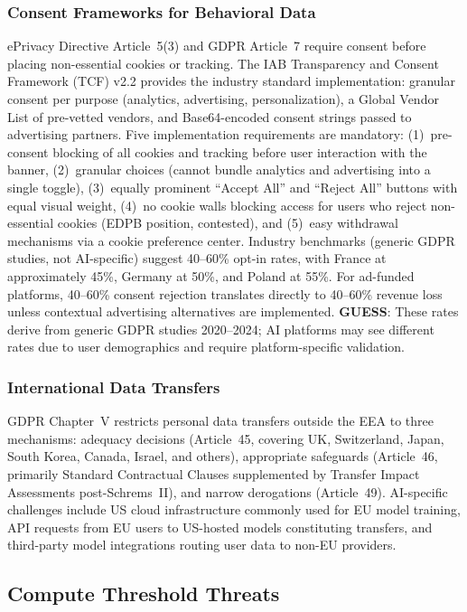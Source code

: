\documentclass[11pt,a4paper]{article}
\begin{document}
\subsubsection{Consent Frameworks for Behavioral Data}

ePrivacy Directive Article~5(3) and GDPR Article~7 require consent before placing non-essential cookies or tracking. The IAB Transparency and Consent Framework (TCF) v2.2 provides the industry standard implementation: granular consent per purpose (analytics, advertising, personalization), a Global Vendor List of pre-vetted vendors, and Base64-encoded consent strings passed to advertising partners. Five implementation requirements are mandatory: (1)~pre-consent blocking of all cookies and tracking before user interaction with the banner, (2)~granular choices (cannot bundle analytics and advertising into a single toggle), (3)~equally prominent ``Accept All'' and ``Reject All'' buttons with equal visual weight, (4)~no cookie walls blocking access for users who reject non-essential cookies (EDPB position, contested), and (5)~easy withdrawal mechanisms via a cookie preference center. Industry benchmarks (generic GDPR studies, not AI-specific) suggest 40--60\% opt-in rates, with France at approximately 45\%, Germany at 50\%, and Poland at 55\%. For ad-funded platforms, 40--60\% consent rejection translates directly to 40--60\% revenue loss unless contextual advertising alternatives are implemented. \textbf{GUESS}: These rates derive from generic GDPR studies 2020--2024; AI platforms may see different rates due to user demographics and require platform-specific validation.

\subsubsection{International Data Transfers}

GDPR Chapter~V restricts personal data transfers outside the EEA to three mechanisms: adequacy decisions (Article~45, covering UK, Switzerland, Japan, South Korea, Canada, Israel, and others), appropriate safeguards (Article~46, primarily Standard Contractual Clauses supplemented by Transfer Impact Assessments post-Schrems~II), and narrow derogations (Article~49). AI-specific challenges include US cloud infrastructure commonly used for EU model training, API requests from EU users to US-hosted models constituting transfers, and third-party model integrations routing user data to non-EU providers.

\subsection{Compute Threshold Threats}
\end{document}
